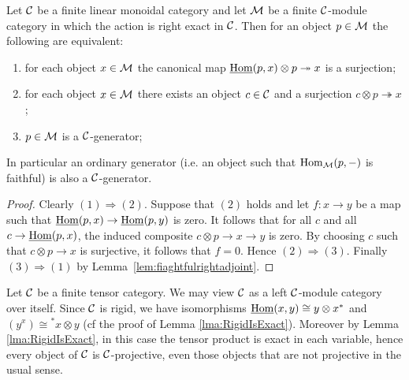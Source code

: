 \documentclass{amsart}
\begin{document}
\begin{lemma}\label{lem:gen}
	Let $\mathcal C$ be a finite linear monoidal category and let $\mathcal M$ be a finite $\mathcal C$-module category in which the action is right exact in $\mathcal C$. Then for an object $p \in \mathcal M$ the following are equivalent:
	\begin{enumerate}
		\item for each object $x \in \mathcal M$ the canonical map $\operatorname{\underline{Hom}}(p,x) \otimes p \twoheadrightarrow x$ is a surjection;
		\item for each object $x \in \mathcal M$ there exists an object $c \in \mathcal C$ and a surjection $c \otimes p \twoheadrightarrow x$;
		\item $p \in \mathcal M$ is a $\mathcal C$-generator;
	\end{enumerate}
	In particular an ordinary generator (i.e. an object such that $\operatorname{Hom}_\mathcal M(p,-)$ is faithful) is also a $\mathcal C$-generator.
\end{lemma}
\begin{proof}
	Clearly $(1) \Rightarrow (2)$. Suppose that $(2)$ holds and let $f: x \to y$ be a map such that $\operatorname{\underline{Hom}}(p, x) \to \operatorname{\underline{Hom}}(p,y)$ is zero. It follows that for all $c$ and all $c \to \operatorname{\underline{Hom}}(p,x)$, the induced composite $c \otimes p \to x \to y$ is zero. By choosing $c$ such that $c \otimes p \to x$ is surjective, it follows that $f=0$. Hence $(2) \Rightarrow (3)$. Finally $(3) \Rightarrow (1)$ by Lemma~\ref{lem:fiaghtfulrightadjoint}.
\end{proof}


\begin{example} \label{ex:rigid_all_C-proj}
	Let $\mathcal C$ be a finite tensor category. We may view $\mathcal C$ as a left $\mathcal C$-module category over itself. Since $\mathcal C$ is rigid, we have isomorphisms $\operatorname{\underline{Hom}}(x,y) \cong y \otimes x^*$ and $(y^x) \cong {}^*x \otimes y$ (cf the proof of Lemma \ref{lma:RigidIsExact}). Moreover by Lemma \ref{lma:RigidIsExact}, in this case the tensor product is exact in each variable, hence every object of $\mathcal C$ is $\mathcal C$-projective, even those objects that are not projective in the usual sense. 
\end{example}
\end{document}
